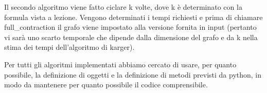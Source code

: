 Il secondo algoritmo viene fatto ciclare k volte, dove k è determinato con la formula vista a lezione. Vengono determinati i tempi richiesti e prima di chiamare full\_contraction il grafo viene impostato alla versione fornita in input (pertanto vi sarà uno scarto temporale che dipende dalla dimensione del grafo e da k nella stima dei tempi dell'algoritmo di karger).

Per tutti gli algoritmi implementati abbiamo cercato di usare, per quanto possibile, la definizione di oggetti e la definizione di metodi previsti da python, in modo da mantenere per quanto possibile il codice comprensibile.